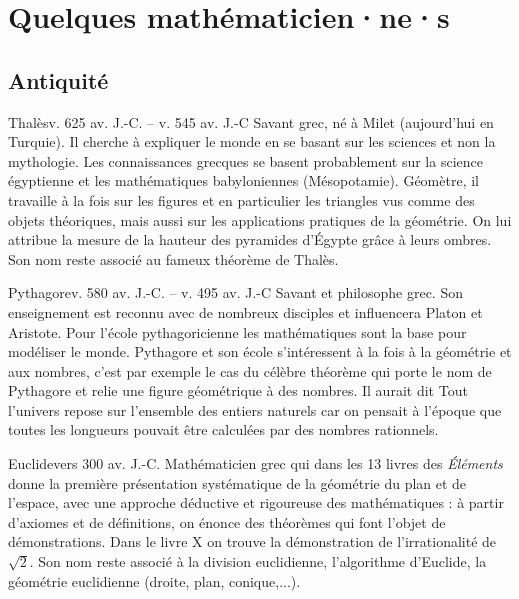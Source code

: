 \documentclass[10pt,class=article,crop=false]{standalone}
\begin{document}
\section{Quelques mathématicien·ne·s}


\begin{multicols}{2}

\subsection{Antiquité}

\begin{biographie}{Thalès}{v. 625 av. J.-C. -- v. 545 av. J.-C}
Savant grec, né à Milet (aujourd'hui en Turquie).  Il cherche à expliquer le monde en se basant sur les sciences et non la mythologie. 
Les connaissances grecques se basent probablement sur la science égyptienne et les mathématiques babyloniennes (Mésopotamie).
Géomètre, il travaille à la fois sur les figures et en particulier les triangles vus comme des objets théoriques, mais aussi sur les applications pratiques de la géométrie. On lui attribue la mesure de la hauteur des pyramides d'Égypte grâce à leurs ombres. Son nom reste associé au fameux théorème de Thalès.
\end{biographie}


\begin{biographie}{Pythagore}{v. 580 av. J.-C. -- v. 495 av. J.-C}
Savant et philosophe grec. Son enseignement est reconnu avec de nombreux disciples et influencera Platon et Aristote. Pour l'école pythagoricienne les mathématiques sont la base pour modéliser le monde. Pythagore et son école s'intéressent à la fois à la géométrie et aux nombres, c'est par exemple le cas du célèbre théorème qui porte le nom de Pythagore et relie une figure géométrique à des nombres. Il aurait dit \og{}Tout l'univers repose sur l'ensemble des entiers naturels\fg{} car on pensait à l'époque que toutes les longueurs pouvait être calculées par des nombres rationnels.
\end{biographie}


\begin{biographie}{Euclide}{vers 300 av. J.-C.}
Mathématicien grec qui dans les 13 livres des \emph{Éléments} donne la première présentation systématique de la géométrie du plan et de l'espace, avec une approche déductive et rigoureuse des mathématiques : à partir d'axiomes et de définitions, on énonce des théorèmes qui font l'objet de démonstrations. Dans le livre X on trouve la démonstration de l'irrationalité de $\sqrt2$.
Son nom reste associé à la division euclidienne, l'algorithme d'Euclide, la géométrie euclidienne (droite, plan, conique,...).
\end{biographie}



\end{multicols}
\end{document}

